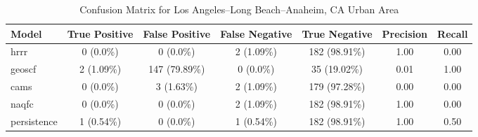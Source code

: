 \begin{table}[h!]
\centering
\begin{tabular}{lcccccc}
\hline
Model & True Positive & False Positive & False Negative & True Negative & Precision & Recall\\ \hline
hrrr & 0 (0.0\%) & 0 (0.0\%) & 2 (1.09\%) & 182 (98.91\%) & \cellcolor{green!25}1.00 & \cellcolor{red!25}0.00 \\ 
geoscf & 2 (1.09\%) & 147 (79.89\%) & 0 (0.0\%) & 35 (19.02\%) & \cellcolor{red!25}0.01 & \cellcolor{green!25}1.00 \\ 
cams & 0 (0.0\%) & 3 (1.63\%) & 2 (1.09\%) & 179 (97.28\%) & \cellcolor{red!25}0.00 & \cellcolor{red!25}0.00 \\ 
naqfc & 0 (0.0\%) & 0 (0.0\%) & 2 (1.09\%) & 182 (98.91\%) & \cellcolor{green!25}1.00 & \cellcolor{red!25}0.00 \\ 
persistence & 1 (0.54\%) & 0 (0.0\%) & 1 (0.54\%) & 182 (98.91\%) & 1.00 & 0.50 \\ 
\hline
\end{tabular}
\caption{Confusion Matrix for Los Angeles--Long Beach--Anaheim, CA Urban Area}
\end{table}
